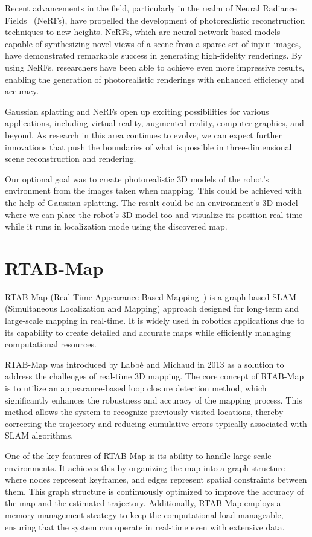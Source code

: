 Recent advancements in the field, particularly in the realm of Neural Radiance Fields~\cite{nerf} (NeRFs), have propelled the development of photorealistic reconstruction techniques to new heights. NeRFs, which are neural network-based models capable of synthesizing novel views of a scene from a sparse set of input images, have demonstrated remarkable success in generating high-fidelity renderings. By using NeRFs, researchers have been able to achieve even more impressive results, enabling the generation of photorealistic renderings with enhanced efficiency and accuracy.

Gaussian splatting and NeRFs open up exciting possibilities for various applications, including virtual reality, augmented reality, computer graphics, and beyond. As research in this area continues to evolve, we can expect further innovations that push the boundaries of what is possible in three-dimensional scene reconstruction and rendering.

Our optional goal was to create photorealistic 3D models of the robot's environment from the images taken when mapping. This could be achieved with the help of Gaussian splatting. The result could be an environment's 3D model where we can place the robot's 3D model too and visualize its position real-time while it runs in localization mode using the discovered map.

\section{RTAB-Map}

RTAB-Map (Real-Time Appearance-Based Mapping~\cite{RTAB_Map_docs}) is a graph-based SLAM (Simultaneous Localization and Mapping) approach designed for long-term and large-scale mapping in real-time. It is widely used in robotics applications due to its capability to create detailed and accurate maps while efficiently managing computational resources.

RTAB-Map was introduced by Labbé and Michaud in 2013 as a solution to address the challenges of real-time 3D mapping. The core concept of RTAB-Map is to utilize an appearance-based loop closure detection method, which significantly enhances the robustness and accuracy of the mapping process. This method allows the system to recognize previously visited locations, thereby correcting the trajectory and reducing cumulative errors typically associated with SLAM algorithms.

One of the key features of RTAB-Map is its ability to handle large-scale environments. It achieves this by organizing the map into a graph structure where nodes represent keyframes, and edges represent spatial constraints between them. This graph structure is continuously optimized to improve the accuracy of the map and the estimated trajectory. Additionally, RTAB-Map employs a memory management strategy to keep the computational load manageable, ensuring that the system can operate in real-time even with extensive data.

